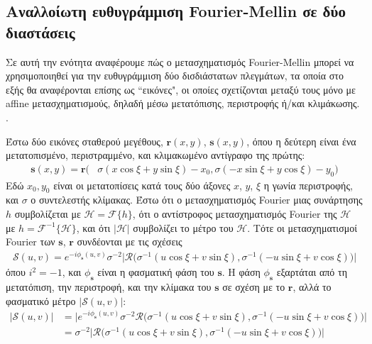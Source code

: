 \subsection{Αναλλοίωτη ευθυγράμμιση Fourier-Mellin σε δύο διαστάσεις}
\label{subsec:01_01_02_7}

Σε αυτή την ενότητα αναφέρουμε πώς ο μετασχηματισμός Fourier-Mellin μπορεί να
χρησιμοποιηθεί για την ευθυγράμμιση δύο δισδιάστατων πλεγμάτων, τα οποία στο
εξής θα αναφέρονται επίσης ως ``εικόνες", οι οποίες σχετίζονται μεταξύ τους
μόνο με affine μετασχηματισμούς, δηλαδή μέσω μετατόπισης, περιστροφής ή/και
κλιμάκωσης.  \cite{Casasent1976,Qin-ShengChen1994a,Reddy1996}.

Έστω δύο εικόνες σταθερού μεγέθους, $\bm{r}(x,y)$, $\bm{s}(x,y)$, όπου η
δεύτερη είναι ένα μετατοπισμένο, περιστραμμένο, και κλιμακωμένο αντίγραφο της
πρώτης:
\begin{align}
  \bm{s}(x,y) = \bm{r}\big( &\sigma(x \cos\xi + y \sin\xi) - x_0, \sigma(-x \sin\xi + y \cos\xi) -y_0 \big) \nonumber
\end{align}
Εδώ $x_0,y_0$ είναι οι μετατοπίσεις κατά τους δύο άξονες $x$, $y$, $\xi$ η
γωνία περιστροφής, και $\sigma$ ο συντελεστής κλίμακας. Έστω ότι ο
μετασχηματισμός Fourier μιας συνάρτησης $h$ συμβολίζεται με $\mathcal{H} =
\mathcal{F}\{h\}$, ότι ο αντίστροφος μετασχηματισμός Fourier της $\mathcal{H}$
με $h = \mathcal{F}^{-1}\{\mathcal{H}\}$, και ότι $|\mathcal{H}|$ συμβολίζει το
μέτρο του $\mathcal{H}$. Τότε οι μετασχηματισμοί Fourier των $\bm{s}$, $\bm{r}$
συνδέονται με τις σχέσεις
\begin{align}
  \mathcal{S}(u,v) = e^{-i \phi_{\bm{s}}(u,v)} \sigma^{-2} \big| \mathcal{R} \big( \sigma^{-1}(u \cos\xi + v \sin\xi), \sigma^{-1}(-u \sin\xi + v \cos\xi) \big) \big| \nonumber
\end{align}
όπου $i^2 = -1$, και $\phi_{\bm{s}}$ είναι η φασματική φάση του $\bm{s}$.
Η φάση $\phi_{\bm{s}}$ εξαρτάται από τη μετατόπιση, την περιστροφή, και την
κλίμακα του $\bm{s}$ σε σχέση με το $\bm{r}$, αλλά το φασματικό μέτρο
$|\mathcal{S}(u,v)|$:
\begin{align}
  \big| \mathcal{S}(u,v) \big| &= \big| e^{-i \phi_{\bm{s}}(u,v)} \sigma^{-2} \mathcal{R} \big( \sigma^{-1}(u \cos\xi + v \sin\xi),
                                                                        \sigma^{-1}(-u \sin\xi + v \cos\xi) \big) \big| \nonumber \\
  &= \sigma^{-2} \big| \mathcal{R} \big( \sigma^{-1}(u \cos\xi + v \sin\xi), \sigma^{-1}(-u \sin\xi + v \cos\xi) \big) \big| \label{eq:spectral_magnitude1}
\end{align}
